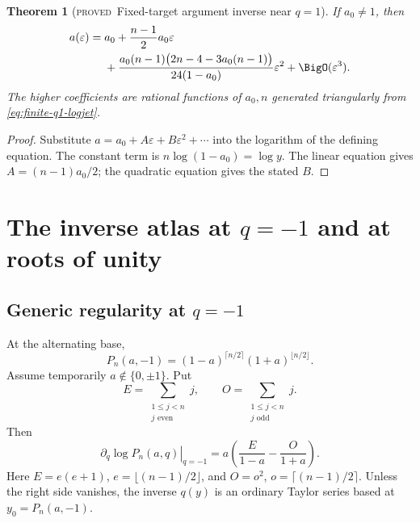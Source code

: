 \documentclass[11pt,letterpaper,oneside,openany]{book}
\newtheorem{theorem}{Theorem}[chapter]
\theoremstyle{definition}
\theoremstyle{remark}
\newcommand{\statusproved}{\textcolor{provedgreen}{\textsc{proved}}}
\begin{document}
\begin{theorem}[\statusproved\ Fixed-target argument inverse near \(q=1\)]
If \(a_0\ne1\), then
\begin{align}
 a(\varepsilon)={}&a_0+\frac{n-1}{2}a_0\varepsilon \notag \\
 &+\frac{a_0(n-1)
 \bigl(2n-4-3a_0(n-1)\bigr)}{24(1-a_0)}\varepsilon^2
 +\BigO(\varepsilon^3).
 \label{eq:finite-a-q1-mixed}
\end{align}
The higher coefficients are rational functions of \(a_0,n\) generated
triangularly from \cref{eq:finite-q1-logjet}.
\end{theorem}
\begin{proof}
Substitute \(a=a_0+A\varepsilon+B\varepsilon^2+\cdots\) into the logarithm of
the defining equation.  The constant term is \(n\log(1-a_0)=\log y\).  The
linear equation gives \(A=(n-1)a_0/2\); the quadratic equation gives the stated
\(B\).
\end{proof}

\chapter{The inverse atlas at \(q=-1\) and at roots of unity}

\section{Generic regularity at \(q=-1\)}
At the alternating base,
\begin{equation}
 P_n(a,-1)=(1-a)^{\lceil n/2\rceil}(1+a)^{\lfloor n/2\rfloor}.
 \label{eq:p-at-minus-one}
\end{equation}
Assume temporarily \(a\notin\{0,\pm1\}\).  Put
\[
 E=\sum_{\substack{1\le j<n\\j\text{ even}}}j,
 \qquad
 O=\sum_{\substack{1\le j<n\\j\text{ odd}}}j.
\]
Then
\begin{equation}
 \left.\partial_q\log P_n(a,q)\right|_{q=-1}
 =a\left(\frac{E}{1-a}-\frac{O}{1+a}\right).
 \label{eq:minus-one-log-first}
\end{equation}
Here
\(E=e(e+1)\), \(e=\lfloor(n-1)/2\rfloor\), and
\(O=o^2\), \(o=\lceil(n-1)/2\rceil\).  Unless the right side vanishes, the
inverse \(q(y)\) is an ordinary Taylor series based at
\(y_0=P_n(a,-1)\).
\end{document}
